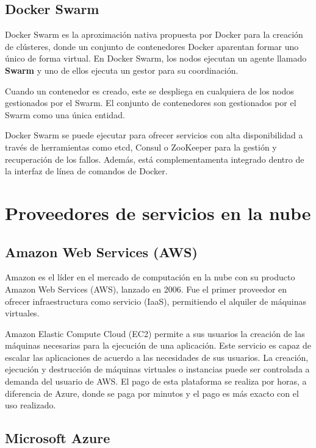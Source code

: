 \documentclass[11pt,spanish,listoffigures]{tfgetsinf}
\begin{document}
\subsection{Docker Swarm}

Docker Swarm es la aproximación nativa propuesta por Docker para la creación de clústeres, donde un conjunto de contenedores Docker aparentan formar uno único de forma virtual. En Docker Swarm, los nodos ejecutan un agente llamado \textbf{Swarm} y uno de ellos ejecuta un gestor para su coordinación.

Cuando un contenedor es creado, este se despliega en cualquiera de los nodos gestionados por el Swarm. El conjunto de contenedores son gestionados por el Swarm como una única entidad.

Docker Swarm se puede ejecutar para ofrecer servicios con alta disponibilidad a través de herramientas como etcd, Consul o ZooKeeper para la gestión y recuperación de los fallos. Además, está complementamenta integrado dentro de la interfaz de línea de comandos de Docker. \cite{DeAlfonso2017}

\section{Proveedores de servicios en la nube}

\subsection{Amazon Web Services (AWS)}
Amazon es el líder en el mercado de computación en la nube con su producto Amazon Web Services (AWS), lanzado en 2006. Fue el primer proveedor en ofrecer infraestructura como servicio (IaaS), permitiendo el alquiler de máquinas virtuales.

Amazon Elastic Compute Cloud (EC2) permite a sus usuarios la creación de las máquinas necesarias para la ejecución de una aplicación. Este servicio es capaz de escalar las aplicaciones de acuerdo a las necesidades de sus usuarios. La creación, ejecución y destrucción de máquinas virtuales o instancias puede ser controlada a demanda del usuario de AWS. El pago de esta plataforma se realiza por horas, a diferencia de Azure, donde se paga por minutos y el pago es más exacto con el uso realizado. \cite{Qaisi2016}

\subsection{Microsoft Azure}
\end{document}
